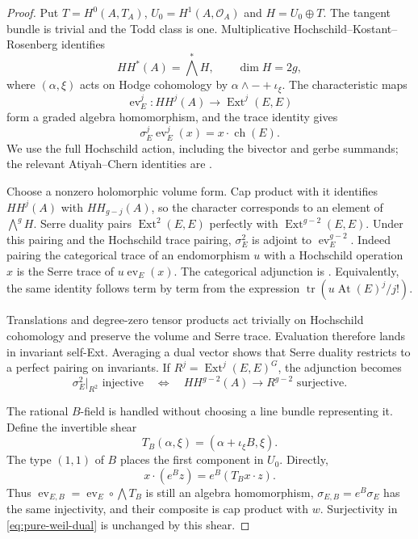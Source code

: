 \documentclass[11pt]{article}
\theoremstyle{definition}
\theoremstyle{remark}
\begin{document}
\begin{proof}
Put $T=H^0(A,T_A)$, $U_0=H^1(A,\mathcal O_A)$ and $H=U_0\oplus T$. The tangent bundle is trivial and the Todd class is one. Multiplicative Hochschild--Kostant--Rosenberg identifies
\[
 HH^*(A)=\bigwedge^*H,\qquad \dim H=2g,
\]
where $(\alpha,\xi)$ acts on Hodge cohomology by $\alpha\wedge-+\iota_\xi$. The characteristic maps
\[
 \operatorname{ev}_E^j:HH^j(A)\longrightarrow\operatorname{Ext}^j(E,E)
\]
form a graded algebra homomorphism, and the trace identity gives
\begin{equation}\label{eq:pure-weil-trace}
 \sigma_E^j\operatorname{ev}_E^j(x)=x\cdot\operatorname{ch}(E).
\end{equation}
We use the full Hochschild action, including the bivector and gerbe summands; the relevant Atiyah--Chern identities are \cite[Proposition~6.2.1, Corollary~6.3.2 and Theorem~6.4.2]{BFHH}.

Choose a nonzero holomorphic volume form. Cap product with it identifies $HH^j(A)$ with $HH_{g-j}(A)$, so the character corresponds to an element of $\bigwedge^gH$. Serre duality pairs $\operatorname{Ext}^2(E,E)$ perfectly with $\operatorname{Ext}^{g-2}(E,E)$. Under this pairing and the Hochschild trace pairing, $\sigma_E^2$ is adjoint to $\operatorname{ev}_E^{g-2}$. Indeed pairing the categorical trace of an endomorphism $u$ with a Hochschild operation $x$ is the Serre trace of $u\operatorname{ev}_E(x)$. The categorical adjunction is \cite[Proposition~11, p.~83; \S7.3, pp.~88--89]{CaldararuWillerton}. Equivalently, the same identity follows term by term from the expression $\operatorname{tr}(u\operatorname{At}(E)^j/j!)$.

Translations and degree-zero tensor products act trivially on Hochschild cohomology and preserve the volume and Serre trace. Evaluation therefore lands in invariant self-Ext. Averaging a dual vector shows that Serre duality restricts to a perfect pairing on invariants. If $R^j=\operatorname{Ext}^j(E,E)^G$, the adjunction becomes
\begin{equation}\label{eq:pure-weil-dual}
 \sigma_E^2|_{R^2}\text{ injective}
 \quad\Longleftrightarrow\quad
 HH^{g-2}(A)\longrightarrow R^{g-2}\text{ surjective}.
\end{equation}

The rational $B$-field is handled without choosing a line bundle representing it. Define the invertible shear
\[
 T_B(\alpha,\xi)=(\alpha+\iota_\xi B,\xi).
\]
The type $(1,1)$ of $B$ places the first component in $U_0$. Directly,
\[
 x\cdot(e^Bz)=e^B(T_Bx\cdot z).
\]
Thus $\operatorname{ev}_{E,B}=\operatorname{ev}_E\circ\bigwedge T_B$ is still an algebra homomorphism, $\sigma_{E,B}=e^B\sigma_E$ has the same injectivity, and their composite is cap product with $w$. Surjectivity in \eqref{eq:pure-weil-dual} is unchanged by this shear.


\end{proof}
\end{document}
